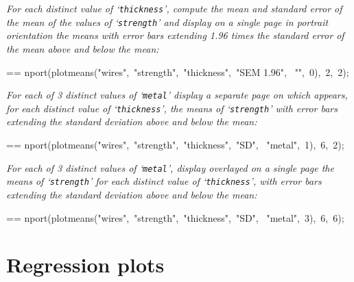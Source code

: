 \documentclass{book}
\makeatletter
\newenvironment{Texinfopreformatted}{%
  \par\GNUTobeylines\obeyspaces\frenchspacing\parskip=\z@\parindent=\z@}{}
{\catcode`\^^M=13 \gdef\GNUTobeylines{\catcode`\^^M=13 \def^^M{\null\par}}}
\newenvironment{Texinfoindented}{\begin{list}{}{}\item\relax}{\end{list}}
\renewcommand{\_}{\Texinfounderscore\discretionary{}{}{}}
\makeatother
\begin{document}
\emph{For each distinct value of `\texttt{thickness}', compute
the mean and standard error of the mean of the values of `\texttt{strength}'
and display on a single page in portrait orientation
the means with error bars extending 1.96 times the standard
error of the mean above and below the mean:}
\begin{Texinfoindented}
\begin{Texinfopreformatted}%
\ttfamily nport(plotmeans("wires",\ "strength",\ "thickness",\ "SEM 1.96",
\                                                 "",\ 0),\ 2,\ 2);
\end{Texinfopreformatted}
\end{Texinfoindented}

\emph{For each of 3 distinct values of `\texttt{metal}' display
a separate page on which appears, for
each distinct value of `\texttt{thickness}',
the means of `\texttt{strength}' with error bars extending the standard
deviation above and below the mean:}
\begin{Texinfoindented}
\begin{Texinfopreformatted}%
\ttfamily nport(plotmeans("wires",\ "strength",\ "thickness",\ "SD",
\                                                 "metal",\ 1),\ 6,\ 2);
\end{Texinfopreformatted}
\end{Texinfoindented}

\emph{For each of 3 distinct values of `\texttt{metal}', display
overlayed on a single page the means of `\texttt{strength}'
for each distinct value of `\texttt{thickness}',
with error bars extending the standard
deviation above and below the mean:}
\begin{Texinfoindented}
\begin{Texinfopreformatted}%
\ttfamily nport(plotmeans("wires",\ "strength",\ "thickness",\ "SD",
\                                                 "metal",\ 3),\ 6,\ 6);
\end{Texinfopreformatted}
\end{Texinfoindented}

\section{{Regression plots}}
\label{anchor:Regression-plots}%
\end{document}
